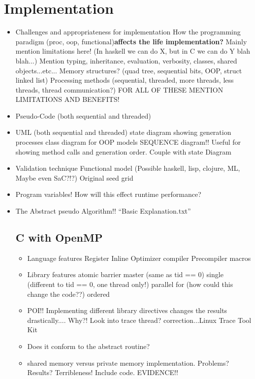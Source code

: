 \documentclass[11pt]{article} %
\begin{document}
\section{Implementation}
\begin{itemize}
\item Challenges and appropriateness for implementation
\subitem How the programming paradigm (proc, oop, functional){\bf affects the life implementation?} Mainly mention limitations here! (In haskell we can do X, but in C we can do Y blah blah...) Mention typing, inheritance, evaluation, verbosity, classes, shared objects...etc...
\subitem Memory structures? (quad tree, sequential bits, OOP, struct linked list)
\subitem Processing methods (sequential, threaded, more threads, less threads, thread communication?)
\subitem FOR ALL OF THESE MENTION LIMITATIONS AND BENEFITS!
\item Pseudo-Code (both sequential and threaded)
\item UML (both sequential and threaded)
\subitem state diagram showing generation processes
\subitem class diagram for OOP models
\subitem SEQUENCE diagram!! Useful for showing method calls and generation order. Couple with state Diagram
\item Validation technique
\subitem Functional model (Possible haskell, lisp, clojure, ML, Maybe even SaC?!?)
\subitem Original seed grid
\item Program variables!
\subitem How will this effect runtime performance?
\item The Abstract pseudo Algorithm!!
\subitem ``Basic Explanation.txt''
\subsection{C with OpenMP}
\begin{itemize}
\item Language features
\subitem Register
\subitem Inline
\subitem Optimizer compiler
\subitem Precompiler macros
\item Library features
\subitem atomic
\subitem barrier
\subitem master (same as tid == 0)
\subitem single (different to tid == 0, one thread only!)
\subitem parallel
\subitem for (how could this change the code??)
\subitem ordered
\item POI!! Implementing different library directives changes the results drastically.... Why?! Look into trace thread? correction...Linux Trace Tool Kit
\item Does it conform to the abstract routine?
\item shared memory versus private memory implementation. Problems? Results? Terribleness! Include code. EVIDENCE!!
\end{itemize} 


\end{itemize}
\end{document}
